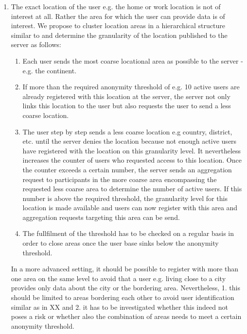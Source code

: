  \begin{enumerate}
 	\item The exact location of the user e.g. the home or work location is not of interest at all. Rather the area for which the user can provide data is of interest. We propose to cluster location areas in a hierarchical structure similar to \parencite{casper} and determine the granularity of the location published to the server as follows:
 	\begin{enumerate}
 		\item Each user sends the most coarse locational area as possible to the server - e.g. the continent.
 		\item If more than the required anonymity threshold of e.g. 10 active users are already registered with this location at the server, the server not only links this location to the user but also requests the user to send a less coarse location.
 		\item The user step by step sends a less coarse location e.g country, district, etc. until the server denies the location because not enough active users have registered with the location on this granularity level. It nevertheless increases the counter of users who requested access to this location. Once the counter exceeds a certain number, the server sends an aggregation request to participants in the more coarse area encompassing the requested less coarse area to determine the number of active users. If this number is above the required threshold, the granularity level for this location is made available and users can now register with this area and aggregation requests targeting this area can be send.
 		\item The fullfilment of the threshold has to be checked on a regular basis in order to close areas once the user base sinks below the anonymity threshold.
 	\end{enumerate}
 	In a more advanced setting, it should be possible to register with more than one area on the same level to avoid that a user e.g. living close to a city provides only data about the city or the bordering area. Nevertheless, 1. this should be limited to areas bordering each other to avoid user identification similar as in XX and 2. it has to be investigated whether this indeed not poses a risk or whether also the combination of areas needs to meet a certain anonymity threshold.
 \end{enumerate}

